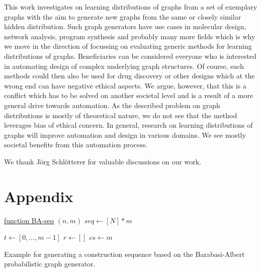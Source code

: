 \documentclass{article}
\begin{document}
This work investigates on learning distributions of graphs from a set of exemplary graphs with the aim to generate new graphs from the same or closely similar hidden distribution.
Such graph generators have use cases in molecular design, network analysis, program synthesis and probably many more fields which is why we move in the direction of focussing on evaluating generic methods for learning distributions of graphs.
Beneficiaries can be considered everyone who is interested in automating design of complex underlying graph structures.
Of course, such methods could then also be used for drug discovery or other designs which at the wrong end can have negative ethical aspects.
We argue, however, that this is a conflict which has to be solved on another societal level and is a result of a more general drive towards automation.
As the described problem on graph distributions is mostly of theoretical nature, we do not see that the method leverages bias of ethical concern.
In general, research on learning distributions of graphs will improve automation and design in various domains.
We see mostly societal benefits from this automation process.



 
\begin{ack}
We thank Jörg Schlötterer for valuable discussions on our work.
 \end{ack}






\newpage
\section*{Appendix}
\begin{algorithm}

\underline{function BA-seq} $(n, m)$\;
\BlankLine
$seq \leftarrow \left[N\right] * m$\;

$t \leftarrow \left[0,\dots,m-1\right]$\;
$r \leftarrow \left[\right]$\;
$cs \leftarrow m$\;
\caption{Example for generating a construction sequence based on the Barabasi-Albert probabilistic graph generator.}
\label{algo:barabasi-albert-conseq}
\end{algorithm}
\end{document}
